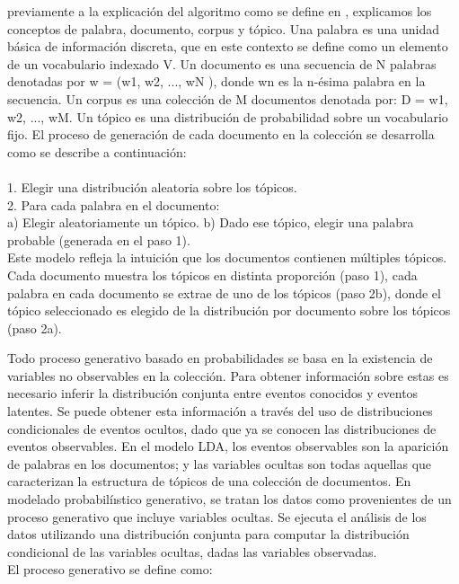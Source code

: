 previamente a la explicación del algoritmo 
como se define en \cite{DescubrimientoPatrones}, explicamos los conceptos de palabra, documento, corpus y tópico.
Una palabra es una unidad básica de información discreta, que en este contexto se
define como un elemento de un vocabulario indexado V.
Un documento es una secuencia de N palabras denotadas por w = (w1, w2, ..., wN ),
donde wn es la n-ésima palabra en la secuencia.
Un corpus es una colección de M documentos denotada por: D = {w1, w2, ..., wM}.
Un tópico es una distribución de probabilidad sobre un vocabulario fijo.
El proceso de generación de cada documento en la colección se desarrolla como se
describe a continuación:\\ \\
1. Elegir una distribución aleatoria sobre los tópicos.\\
2. Para cada palabra en el documento: \\
\subitem a) Elegir aleatoriamente un tópico. 
\subitem b) Dado ese tópico, elegir una palabra probable (generada en el paso 1). \\

Este modelo refleja la intuición que los documentos contienen múltiples tópicos.
Cada documento muestra los tópicos en distinta proporción (paso 1), cada palabra en
cada documento se extrae de uno de los tópicos (paso 2b), donde el tópico seleccionado
es elegido de la distribución por documento sobre los tópicos (paso 2a).

Todo proceso generativo basado en probabilidades se basa en la existencia de variables
no observables en la colección. Para obtener información sobre estas es necesario
inferir la distribución conjunta entre eventos conocidos y eventos latentes. Se puede
obtener esta información a través del uso de distribuciones condicionales de eventos
ocultos, dado que ya se conocen las distribuciones de eventos observables. En el modelo
LDA, los eventos observables son la aparición de palabras en los documentos; y las
variables ocultas son todas aquellas que caracterizan la estructura de tópicos de una
colección de documentos.
En modelado probabilíıstico generativo, se tratan los datos como provenientes de
un proceso generativo que incluye variables ocultas. Se ejecuta el análisis de los datos
utilizando una distribución conjunta para computar la distribución condicional de las
variables ocultas, dadas las variables observadas.\\

El proceso generativo se define como:

